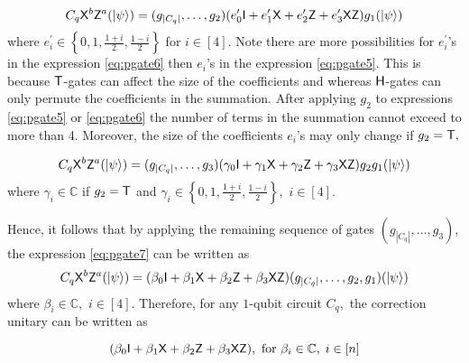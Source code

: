 \begin{equation}
\begin{aligned}
\label{eq:pgate6}
C_q {\sf X}^b{\sf Z}^a ({\lvert}\psi\rangle)=(g_{|C_q|},\ldots,g_2)(e_0^\prime {\sf I} +  e_1^\prime {\sf X} + e_2^\prime {\sf Z} + e_3^\prime {\sf X} {\sf Z})g_1 ({\lvert}\psi\rangle)
\end{aligned}
\end{equation}
where $e_i^\prime \in\left\{0,1, \frac{1+i}{2}, \frac{1-i}{2}\right\}$  for $i\in[4].$ Note there are more possibilities for $e_i^\prime$'s in the expression \ref{eq:pgate6} then $e_i$'s in the expression \ref{eq:pgate5}. This is because ${\sf T}$-gates can affect the size of the coefficients and whereas ${\sf H}$-gates can only permute the coefficients in the summation. After applying $g_2$ to expressions \ref{eq:pgate5} or \ref{eq:pgate6} the number of terms in the summation cannot exceed to more than 4. Moreover, the size of the coefficients $e_i$'s may only change if $g_2={\sf T},$ 

\begin{equation}
\begin{aligned}
\label{eq:pgate7}
C_q {\sf X}^b{\sf Z}^a ({\lvert}\psi\rangle)=(g_{|C_q|},\ldots,g_3)(\gamma_0 {\sf I} +  \gamma_1 {\sf X} + \gamma_2 {\sf Z} + \gamma_3 {\sf X} {\sf Z})g_2g_1 ({\lvert}\psi\rangle)
\end{aligned}
\end{equation}
where $\gamma_i \in \mathbb{C}$ if $g_2={\sf T}$ and $\gamma_i  \in\left\{0,1, \frac{1+i}{2}, \frac{1-i}{2}\right\},$  $i\in[4].$

Hence, it follows  that by applying the remaining  sequence of gates $(g_{|C_q|},\ldots,g_3)$, the expression \ref{eq:pgate7} can be written as 
\begin{equation}
\begin{aligned}
\label{eq:pgate8}
C_q {\sf X}^b{\sf Z}^a ({\lvert}\psi\rangle)=(\beta_0 {\sf I} +  \beta_1 {\sf X} + \beta_2 {\sf Z} + \beta_3{\sf X} {\sf Z})(g_{|C_q|},\ldots,g_2,g_1 )({\lvert}\psi\rangle) 
\end{aligned}
\end{equation}
where $\beta_i  \in \mathbb{C},$ $i\in[4].$  Therefore, for any  $1$-qubit circuit $C_q,$ the correction unitary can be written as  

\begin{equation}
\label{eq:pgate9}
 (\beta_0 {\sf I} +   \beta_1 {\sf X} +  \beta_2 {\sf Z} +  \beta_3 {\sf X}{\sf Z}), \mbox{ for }  \beta_i \in \mathbb{C},\; i\in[n]
\end{equation}


